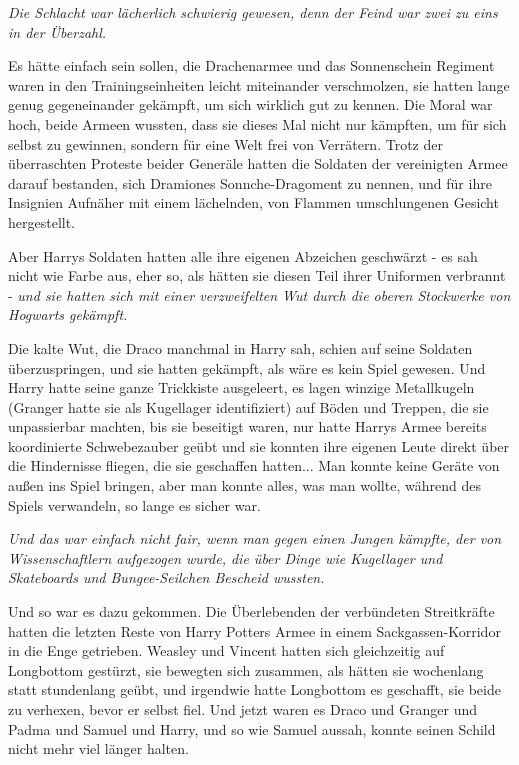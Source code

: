 \emph{Die Schlacht war lächerlich schwierig gewesen, denn der Feind war zwei zu eins in der Überzahl.}

Es hätte einfach sein sollen, die Drachenarmee und das Sonnenschein Regiment
waren in den Trainingseinheiten leicht miteinander verschmolzen, sie hatten
lange genug gegeneinander gekämpft, um sich wirklich gut zu kennen. Die Moral
war hoch, beide Armeen wussten, dass sie dieses Mal nicht nur kämpften, um für
sich selbst zu gewinnen, sondern für eine Welt frei von Verrätern. Trotz der
überraschten Proteste beider Generäle hatten die Soldaten der vereinigten Armee
darauf bestanden, sich Dramiones Sonnche-Dragoment zu nennen, und für ihre
Insignien Aufnäher mit einem lächelnden, von Flammen umschlungenen Gesicht
hergestellt.

Aber Harrys Soldaten hatten alle ihre eigenen Abzeichen geschwärzt - es sah
nicht wie Farbe aus, eher so, als hätten sie diesen Teil ihrer Uniformen
verbrannt - \emph{und sie hatten sich mit einer verzweifelten Wut durch die
oberen Stockwerke von Hogwarts gekämpft.}

Die kalte Wut, die Draco manchmal in Harry sah, schien auf seine Soldaten
überzuspringen, und sie hatten gekämpft, als wäre es kein Spiel gewesen. Und
Harry hatte seine ganze Trickkiste ausgeleert, es lagen winzige Metallkugeln
(Granger hatte sie als \glqq Kugellager\grqq{} identifiziert) auf Böden und
Treppen, die sie unpassierbar machten, bis sie beseitigt waren, nur hatte Harrys
Armee bereits koordinierte Schwebezauber geübt und sie konnten ihre eigenen
Leute direkt über die Hindernisse fliegen, die sie geschaffen hatten... Man
konnte keine Geräte von außen ins Spiel bringen, aber man konnte alles, was man
wollte, während des Spiels verwandeln, so lange es sicher war.

\emph{ Und das war einfach nicht fair, wenn man gegen einen Jungen kämpfte, der von Wissenschaftlern aufgezogen wurde, die über Dinge wie Kugellager und Skateboards und Bungee-Seilchen Bescheid wussten.}

Und so war es dazu gekommen. Die Überlebenden der verbündeten Streitkräfte
hatten die letzten Reste von Harry Potters Armee in einem Sackgassen-Korridor in
die Enge getrieben. Weasley und Vincent hatten sich gleichzeitig auf Longbottom
gestürzt, sie bewegten sich zusammen, als hätten sie wochenlang statt
stundenlang geübt, und irgendwie hatte Longbottom es geschafft, sie beide zu
verhexen, bevor er selbst fiel. Und jetzt waren es Draco und Granger und Padma
und Samuel und Harry, und so wie Samuel aussah, konnte seinen Schild nicht mehr
viel länger halten.

